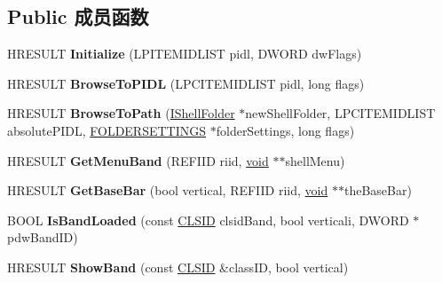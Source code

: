 \subsection*{Public 成员函数}
\begin{DoxyCompactItemize}
\item 
\mbox{\label{class_c_shell_browser_a55be995f542516548bb19c6138f45c90}} 
H\+R\+E\+S\+U\+LT {\bfseries Initialize} (L\+P\+I\+T\+E\+M\+I\+D\+L\+I\+ST pidl, D\+W\+O\+RD dw\+Flags)
\item 
\mbox{\label{class_c_shell_browser_a0e276a5a5815e48cea8ab5330a315a35}} 
H\+R\+E\+S\+U\+LT {\bfseries Browse\+To\+P\+I\+DL} (L\+P\+C\+I\+T\+E\+M\+I\+D\+L\+I\+ST pidl, long flags)
\item 
\mbox{\label{class_c_shell_browser_a0b5366311cadffcc7379e17b9585e41a}} 
H\+R\+E\+S\+U\+LT {\bfseries Browse\+To\+Path} (\hyperlink{interface_i_shell_folder}{I\+Shell\+Folder} $\ast$new\+Shell\+Folder, L\+P\+C\+I\+T\+E\+M\+I\+D\+L\+I\+ST absolute\+P\+I\+DL, \hyperlink{struct_f_o_l_d_e_r_s_e_t_t_i_n_g_s}{F\+O\+L\+D\+E\+R\+S\+E\+T\+T\+I\+N\+GS} $\ast$folder\+Settings, long flags)
\item 
\mbox{\label{class_c_shell_browser_a409d46f43b3e8ad98079427f69dbad8e}} 
H\+R\+E\+S\+U\+LT {\bfseries Get\+Menu\+Band} (R\+E\+F\+I\+ID riid, \hyperlink{interfacevoid}{void} $\ast$$\ast$shell\+Menu)
\item 
\mbox{\label{class_c_shell_browser_a878fc56de03a55a7376fc8e65ce88870}} 
H\+R\+E\+S\+U\+LT {\bfseries Get\+Base\+Bar} (bool vertical, R\+E\+F\+I\+ID riid, \hyperlink{interfacevoid}{void} $\ast$$\ast$the\+Base\+Bar)
\item 
\mbox{\label{class_c_shell_browser_ac6629cd11d18afb2f518d0c93d142511}} 
B\+O\+OL {\bfseries Is\+Band\+Loaded} (const \hyperlink{struct___i_i_d}{C\+L\+S\+ID} clsid\+Band, bool verticali, D\+W\+O\+RD $\ast$pdw\+Band\+ID)
\item 
\mbox{\label{class_c_shell_browser_ab273fdac55f4d70d2110fddeeee1cfa8}} 
H\+R\+E\+S\+U\+LT {\bfseries Show\+Band} (const \hyperlink{struct___i_i_d}{C\+L\+S\+ID} \&class\+ID, bool vertical)

\end{DoxyCompactItemize}
